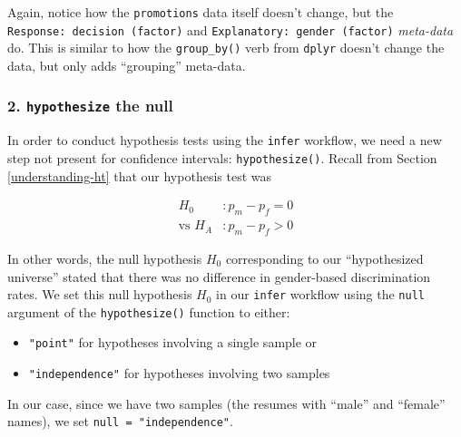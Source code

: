 \documentclass[
]{book}
\newenvironment{Shaded}{\begin{snugshade}}{\end{snugshade}}
\newcommand{\DataTypeTok}[1]{\textcolor[rgb]{0.13,0.29,0.53}{#1}}
\newcommand{\KeywordTok}[1]{\textcolor[rgb]{0.13,0.29,0.53}{\textbf{#1}}}
\newcommand{\NormalTok}[1]{#1}
\newcommand{\OperatorTok}[1]{\textcolor[rgb]{0.81,0.36,0.00}{\textbf{#1}}}
\newcommand{\StringTok}[1]{\textcolor[rgb]{0.31,0.60,0.02}{#1}}
\providecommand{\tightlist}{%
  \setlength{\itemsep}{0pt}\setlength{\parskip}{0pt}}
\begin{document}
Again, notice how the \texttt{promotions} data itself doesn't change, but the \texttt{Response:\ decision\ (factor)} and \texttt{Explanatory:\ gender\ (factor)} \emph{meta-data} do. This is similar to how the \texttt{group\_by()} verb from \texttt{dplyr} doesn't change the data, but only adds ``grouping'' meta-data.

\hypertarget{hypothesize-the-null}{%
\subsubsection*{\texorpdfstring{2. \texttt{hypothesize} the null}{2. hypothesize the null}}\label{hypothesize-the-null}}

In order to conduct hypothesis tests using the \texttt{infer} workflow, we need a new step not present for confidence intervals:  \texttt{hypothesize()}. Recall from Section \ref{understanding-ht} that our hypothesis test was

\[
\begin{aligned}
H_0 &: p_{m} - p_{f} = 0\\
\text{vs } H_A&: p_{m} - p_{f} > 0
\end{aligned}
\]

In other words, the null hypothesis \(H_0\) corresponding to our ``hypothesized universe'' stated that there was no difference in gender-based discrimination rates. We set this null hypothesis \(H_0\) in our \texttt{infer} workflow using the \texttt{null} argument of the \texttt{hypothesize()} function to either:

\begin{itemize}
\tightlist
\item
  \texttt{"point"} for hypotheses involving a single sample or
\item
  \texttt{"independence"} for hypotheses involving two samples
\end{itemize}

In our case, since we have two samples (the resumes with ``male'' and ``female'' names), we set \texttt{null\ =\ "independence"}.

\begin{Shaded}
\end{Shaded}
\end{document}
